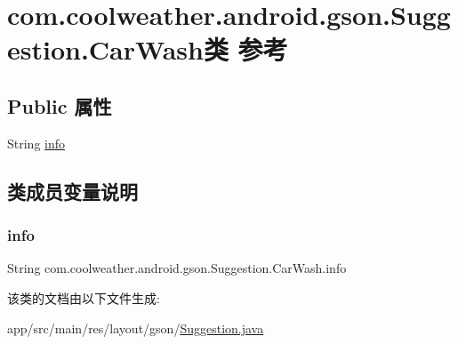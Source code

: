 \hypertarget{classcom_1_1coolweather_1_1android_1_1gson_1_1_suggestion_1_1_car_wash}{}\section{com.\+coolweather.\+android.\+gson.\+Suggestion.\+Car\+Wash类 参考}
\label{classcom_1_1coolweather_1_1android_1_1gson_1_1_suggestion_1_1_car_wash}
\subsection*{Public 属性}
\begin{DoxyCompactItemize}
\item 
String \mbox{\hyperlink{classcom_1_1coolweather_1_1android_1_1gson_1_1_suggestion_1_1_car_wash_a135928cdd8896cb9a3c31672c06d20d7}{info}}
\end{DoxyCompactItemize}


\subsection{类成员变量说明}
\mbox{\label{classcom_1_1coolweather_1_1android_1_1gson_1_1_suggestion_1_1_car_wash_a135928cdd8896cb9a3c31672c06d20d7}} 
\subsubsection{\texorpdfstring{info}{info}}
{\footnotesize\ttfamily String com.\+coolweather.\+android.\+gson.\+Suggestion.\+Car\+Wash.\+info}



该类的文档由以下文件生成\+:\begin{DoxyCompactItemize}
\item 
app/src/main/res/layout/gson/\mbox{\hyperlink{res_2layout_2gson_2_suggestion_8java}{Suggestion.\+java}}\end{DoxyCompactItemize}
